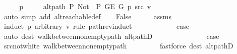\begin{isabellebody}
\ \ \isamarkupfalse%
\ \isamarkupfalse%
\ p\ \isanewline
\ \ \ \ {\isachardoublequoteopen}alt{\isacharunderscore}{\kern0pt}path\ P{\isacharprime}{\kern0pt}{\isacharprime}{\kern0pt}\ {\isacharparenleft}{\kern0pt}Not\ {\isasymcirc}\ P{\isacharprime}{\kern0pt}{\isacharprime}{\kern0pt}{\isacharparenright}{\kern0pt}\ {\isacharparenleft}{\kern0pt}G{\isachardot}{\kern0pt}E\ G{\isacharparenright}{\kern0pt}\ p\ src\ v{\isachardoublequoteclose}\isanewline
\ \ \ \ \isamarkupfalse%
\ {\isacharparenleft}{\kern0pt}auto\ simp\ add{\isacharcolon}{\kern0pt}\ alt{\isacharunderscore}{\kern0pt}reachable{\isacharunderscore}{\kern0pt}def{\isacharparenright}{\kern0pt}\isanewline
\ \ \isamarkupfalse%
\ False\isanewline
\ \ \ \ \isamarkupfalse%
\ assms\isanewline
\ \ \isamarkupfalse%
\ {\isacharparenleft}{\kern0pt}induct\ p\ arbitrary{\isacharcolon}{\kern0pt}\ v\ rule{\isacharcolon}{\kern0pt}\ path{\isacharunderscore}{\kern0pt}rev{\isacharunderscore}{\kern0pt}induct{\isacharparenright}{\kern0pt}\isanewline
\ \ \ \ \isamarkupfalse%
\ {}\isanewline
\ \ \ \ \isamarkupfalse%
\ {\isacharquery}{\kern0pt}case\isanewline
\ \ \ \ \ \ \isamarkupfalse%
\ {\isacharparenleft}{\kern0pt}auto\ dest{\isacharcolon}{\kern0pt}\ walk{\isacharunderscore}{\kern0pt}between{\isacharunderscore}{\kern0pt}nonempty{\isacharunderscore}{\kern0pt}path{\isacharparenleft}{\kern0pt}{}{\isacharparenright}{\kern0pt}\ alt{\isacharunderscore}{\kern0pt}pathD{\isacharparenleft}{\kern0pt}{}{\isacharparenright}{\kern0pt}{\isacharparenright}{\kern0pt}\isanewline
\ \ \isamarkupfalse%
\isanewline
\ \ \ \ \isamarkupfalse%
\ {}\isanewline
\ \ \ \ \isamarkupfalse%
\ {\isacharquery}{\kern0pt}case\isanewline
\ \ \ \ \ \ \isamarkupfalse%
\ src{\isacharunderscore}{\kern0pt}not{\isacharunderscore}{\kern0pt}white\ walk{\isacharunderscore}{\kern0pt}between{\isacharunderscore}{\kern0pt}nonempty{\isacharunderscore}{\kern0pt}path{\isacharparenleft}{\kern0pt}{}{\isacharcomma}{\kern0pt}\ {}{\isacharparenright}{\kern0pt}\isanewline
\ \ \ \ \ \ \isamarkupfalse%
\ {\isacharparenleft}{\kern0pt}fastforce\ dest{\isacharcolon}{\kern0pt}\ alt{\isacharunderscore}{\kern0pt}pathD{\isacharparenleft}{\kern0pt}{}{\isacharparenright}{\kern0pt}{\isacharparenright}{\kern0pt}\isanewline
\ \ \isamarkupfalse%

\end{isabellebody}
